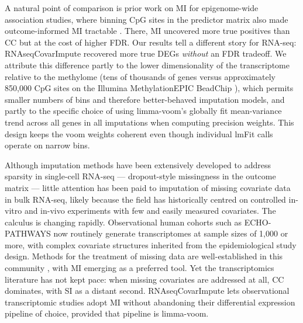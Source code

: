 \documentclass[11pt]{article}
\begin{document}
A natural point of comparison is prior work on MI for epigenome-wide association studies, where binning CpG sites in the predictor matrix also made outcome-informed MI tractable \citep{mill2013epigenomewide,weinhold2020statistical}. There, MI uncovered more true positives than CC but at the cost of higher FDR. Our results tell a different story for RNA-seq: RNAseqCovarImpute recovered more true DEGs \emph{without} an FDR tradeoff. We attribute this difference partly to the lower dimensionality of the transcriptome relative to the methylome (tens of thousands of genes versus approximately 850{,}000 CpG sites on the Illumina MethylationEPIC BeadChip \citep{pidsley2016critical}), which permits smaller numbers of bins and therefore better-behaved imputation models, and partly to the specific choice of using limma-voom's globally fit mean-variance trend across all genes in all imputations when computing precision weights. This design keeps the voom weights coherent even though individual lmFit calls operate on narrow bins.

Although imputation methods have been extensively developed to address sparsity in single-cell RNA-seq --- dropout-style missingness in the outcome matrix \citep{hao2024scrnaseq} --- little attention has been paid to imputation of missing covariate data in bulk RNA-seq, likely because the field has historically centred on controlled in-vitro and in-vivo experiments with few and easily measured covariates. The calculus is changing rapidly. Observational human cohorts such as ECHO-PATHWAYS \citep{paulson2022lewinn,paquette2023placental} now routinely generate transcriptomes at sample sizes of 1,000 or more, with complex covariate structures inherited from the epidemiological study design. Methods for the treatment of missing data are well-established in this community \citep{sterne2009multiple,little2019statistical,marshall2009combining}, with MI emerging as a preferred tool. Yet the transcriptomics literature has not kept pace: when missing covariates are addressed at all, CC dominates, with SI as a distant second. RNAseqCovarImpute lets observational transcriptomic studies adopt MI without abandoning their differential expression pipeline of choice, provided that pipeline is limma-voom.
\end{document}
